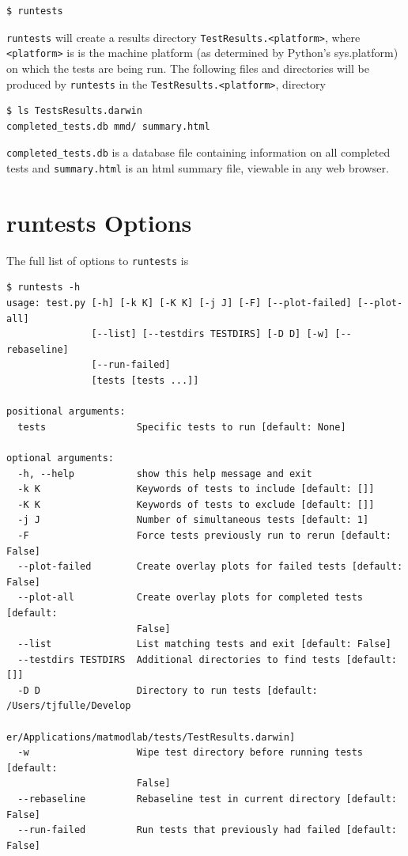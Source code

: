 \documentclass[12pt,report,strict]{SANDreport/SANDreport}
\newcommand{\runtests}{\texttt{runtests}}
\begin{document}
\begin{verbatim}
$ runtests
\end{verbatim}

\runtests{} will create a results directory \verb|TestResults.<platform>|,
where \texttt{<platform>} is is the machine platform (as determined by
Python's sys.platform) on which the tests are being run. The following files
and directories will be produced by \runtests{} in the
\verb|TestResults.<platform>|, directory
\begin{verbatim}
$ ls TestsResults.darwin
completed_tests.db mmd/ summary.html
\end{verbatim}
%
\texttt{completed\_tests.db} is a database file containing information on all
completed tests and \texttt{summary.html} is an html summary file, viewable in
any web browser.

\section{runtests Options}
\label{sec:rtest-options}
The full list of options to \runtests{} is
\begin{verbatim}
$ runtests -h
usage: test.py [-h] [-k K] [-K K] [-j J] [-F] [--plot-failed] [--plot-all]
               [--list] [--testdirs TESTDIRS] [-D D] [-w] [--rebaseline]
               [--run-failed]
               [tests [tests ...]]

positional arguments:
  tests                Specific tests to run [default: None]

optional arguments:
  -h, --help           show this help message and exit
  -k K                 Keywords of tests to include [default: []]
  -K K                 Keywords of tests to exclude [default: []]
  -j J                 Number of simultaneous tests [default: 1]
  -F                   Force tests previously run to rerun [default: False]
  --plot-failed        Create overlay plots for failed tests [default: False]
  --plot-all           Create overlay plots for completed tests [default:
                       False]
  --list               List matching tests and exit [default: False]
  --testdirs TESTDIRS  Additional directories to find tests [default: []]
  -D D                 Directory to run tests [default: /Users/tjfulle/Develop
                       er/Applications/matmodlab/tests/TestResults.darwin]
  -w                   Wipe test directory before running tests [default:
                       False]
  --rebaseline         Rebaseline test in current directory [default: False]
  --run-failed         Run tests that previously had failed [default: False]
\end{verbatim}
\end{document}
